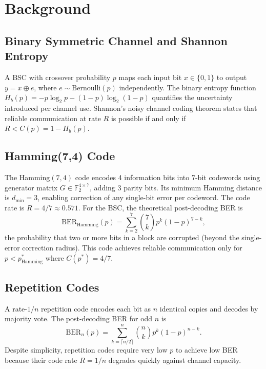 \section{Background}
\label{sec:background}

\subsection{Binary Symmetric Channel and Shannon Entropy}

A BSC with crossover probability $p$ maps each input bit $x \in \{0,1\}$ to
output $y = x \oplus e$, where $e \sim \text{Bernoulli}(p)$ independently.
The binary entropy function $H_b(p) = -p\log_2 p - (1-p)\log_2(1-p)$ quantifies
the uncertainty introduced per channel use.  Shannon's noisy channel coding
theorem \cite{shannon1948,cover2006} states that reliable communication at rate
$R$ is possible if and only if $R < C(p) = 1 - H_b(p)$.

\subsection{Hamming(7,4) Code}

The Hamming$(7,4)$ code encodes 4 information bits into 7-bit codewords using
generator matrix $G \in \mathbb{F}_2^{4\times 7}$, adding 3 parity bits.  Its
minimum Hamming distance is $d_{\min}=3$, enabling correction of any single-bit
error per codeword.  The code rate is $R = 4/7 \approx 0.571$.  For the BSC,
the theoretical post-decoding BER is
\begin{equation}
  \text{BER}_\text{Hamming}(p)
    = \sum_{k=2}^{7}\binom{7}{k}p^k(1-p)^{7-k},
\end{equation}
the probability that two or more bits in a block are corrupted (beyond the
single-error correction radius). This code achieves reliable communication only
for $p < p^*_\text{Hamming}$ where $C(p^*) = 4/7$.

\subsection{Repetition Codes}

A rate-$1/n$ repetition code encodes each bit as $n$ identical copies and
decodes by majority vote.  The post-decoding BER for odd $n$ is
\begin{equation}
  \text{BER}_n(p) = \sum_{k=\lceil n/2 \rceil}^{n}\binom{n}{k}p^k(1-p)^{n-k}.
\end{equation}
Despite simplicity, repetition codes require very low $p$ to achieve low BER
because their code rate $R=1/n$ degrades quickly against channel capacity.

